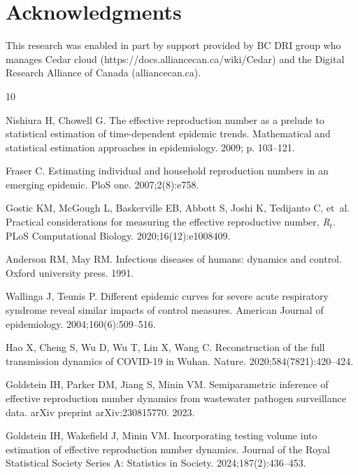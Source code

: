 \documentclass[10pt,letterpaper]{article}
\begin{document}
\section*{Acknowledgments}

This research was enabled in part by support provided by 
BC DRI group who manages Cedar cloud (https://docs.alliancecan.ca/wiki/Cedar)
and the Digital Research Alliance of Canada (alliancecan.ca).

\nolinenumbers

\begin{thebibliography}{10}

  Nishiura H, Chowell G.
  \newblock The effective reproduction number as a prelude to statistical
    estimation of time-dependent epidemic trends.
  \newblock Mathematical and statistical estimation approaches in epidemiology.
    2009; p. 103--121.
  
  Fraser C.
  \newblock Estimating individual and household reproduction numbers in an
    emerging epidemic.
  \newblock PloS one. 2007;2(8):e758.
  
  Gostic KM, McGough L, Baskerville EB, Abbott S, Joshi K, Tedijanto C, et~al.
  \newblock Practical considerations for measuring the effective reproductive
    number, \emph{R}$_t$.
  \newblock PLoS Computational Biology. 2020;16(12):e1008409.
  
  Anderson RM, May RM.
  \newblock Infectious diseases of humans: dynamics and control.
  \newblock Oxford university press. 1991.
  
  Wallinga J, Teunis P.
  \newblock Different epidemic curves for severe acute respiratory syndrome
    reveal similar impacts of control measures.
  \newblock American Journal of epidemiology. 2004;160(6):509--516.
  
  Hao X, Cheng S, Wu D, Wu T, Lin X, Wang C.
  \newblock Reconstruction of the full transmission dynamics of COVID-19 in
    Wuhan.
  \newblock Nature. 2020;584(7821):420--424.
  
  Goldstein IH, Parker DM, Jiang S, Minin VM.
  \newblock Semiparametric inference of effective reproduction number dynamics
    from wastewater pathogen surveillance data.
  \newblock arXiv preprint arXiv:230815770. 2023.
  
  Goldstein IH, Wakefield J, Minin VM.
  \newblock Incorporating testing volume into estimation of effective
    reproduction number dynamics.
  \newblock Journal of the Royal Statistical Society Series A: Statistics in
    Society. 2024;187(2):436--453.
  

\end{thebibliography}
\end{document}
